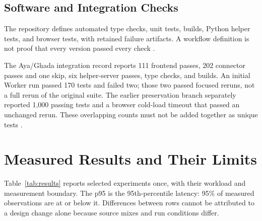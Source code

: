 \subsection{Software and Integration Checks}

The repository defines automated type checks, unit tests, builds, Python helper tests, and browser tests, with retained failure artifacts. A workflow definition is not proof that every version passed every check \cite{checks}.

The Aya/Ghada integration record reports 111 frontend passes, 202 connector passes and one skip, six helper-server passes, type checks, and builds. An initial Worker run passed 170 tests and failed two; those two passed focused reruns, not a full rerun of the original suite. The earlier preservation branch separately reported 1,000 passing tests and a browser cold-load timeout that passed an unchanged rerun. These overlapping counts must not be added together as unique tests \cite{currentintegration,ghadaintegration}.

\section{Measured Results and Their Limits}

Table~\ref{tab:results} reports selected experiments once, with their workload and measurement boundary. The p95 is the 95th-percentile latency: 95\% of measured observations are at or below it. Differences between rows cannot be attributed to a design change alone because source mixes and run conditions differ.

